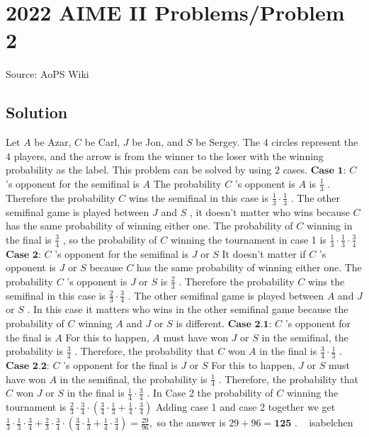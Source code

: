 \documentclass[12pt]{article}
\begin{document}
\section*{{2022 AIME II Problems/Problem 2}}
Source: AoPS Wiki

\subsection*{Solution}
Let $A$ be Azar, $C$ be Carl, $J$ be Jon, and $S$ be Sergey. The $4$ circles represent the $4$ players, and the arrow is from the winner to the loser with the winning probability as the label. This problem can be solved by using $2$ cases. $\textbf{Case 1:}$ $C$ 's opponent for the semifinal is $A$ The probability $C$ 's opponent is $A$ is $\frac13$ . Therefore the probability $C$ wins the semifinal in this case is $\frac13 \cdot \frac13$ . The other semifinal game is played between $J$ and $S$ , it doesn't matter who wins because $C$ has the same probability of winning either one. The probability of $C$ winning in the final is $\frac34$ , so the probability of $C$ winning the tournament in case 1 is $\frac13 \cdot \frac13 \cdot \frac34$ $\textbf{Case 2:}$ $C$ 's opponent for the semifinal is $J$ or $S$ It doesn't matter if $C$ 's opponent is $J$ or $S$ because $C$ has the same probability of winning either one. The probability $C$ 's opponent is $J$ or $S$ is $\frac23$ . Therefore the probability $C$ wins the semifinal in this case is $\frac23 \cdot \frac34$ . The other semifinal game is played between $A$ and $J$ or $S$ . In this case it matters who wins in the other semifinal game because the probability of $C$ winning $A$ and $J$ or $S$ is different. $\textbf{Case 2.1:}$ $C$ 's opponent for the final is $A$ For this to happen, $A$ must have won $J$ or $S$ in the semifinal, the probability is $\frac34$ . Therefore, the probability that $C$ won $A$ in the final is $\frac34 \cdot \frac13$ . $\textbf{Case 2.2:}$ $C$ 's opponent for the final is $J$ or $S$ For this to happen, $J$ or $S$ must have won $A$ in the semifinal, the probability is $\frac14$ . Therefore, the probability that $C$ won $J$ or $S$ in the final is $\frac14 \cdot \frac34$ . In Case 2 the probability of $C$ winning the tournament is $\frac23 \cdot \frac34 \cdot (\frac34 \cdot \frac13 + \frac14 \cdot \frac34)$ Adding case 1 and case 2 together we get $\frac13 \cdot \frac13 \cdot \frac34 + \frac23 \cdot \frac34 \cdot (\frac34 \cdot \frac13 + \frac14 \cdot \frac34) = \frac{29}{96},$ so the answer is $29 + 96 = \boxed{\textbf{125}}$ . ~ isabelchen
\end{document}
